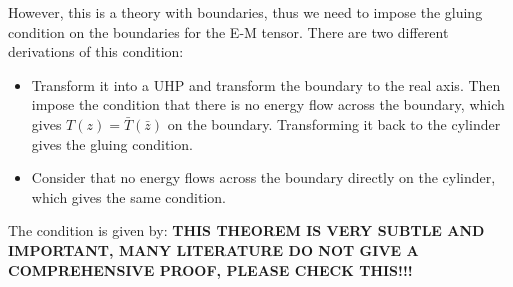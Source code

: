 However, this is a theory with boundaries, thus we need to impose the
gluing condition on the boundaries for the E-M tensor. There are two
different derivations of this condition:
\begin{itemize}
  \item Transform it into a UHP and transform the boundary to the
    real axis. Then impose the condition that there is no energy flow
    across the boundary, which gives $ T(z) = \bar{T}(\bar{z}) $ on
    the boundary. Transforming it back to the cylinder gives the
    gluing condition.

  \item Consider that no energy flows across the boundary directly on
    the cylinder, which gives the same condition.
\end{itemize}
The condition is given by:
\textbf{THIS THEOREM IS VERY SUBTLE AND IMPORTANT, MANY LITERATURE DO
NOT GIVE A COMPREHENSIVE PROOF, PLEASE CHECK THIS!!!}

